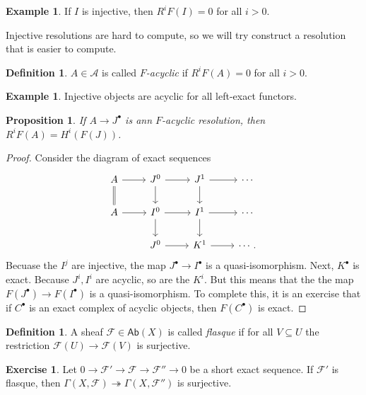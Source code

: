 \documentclass[leqno, openany]{memoir}
\newtheorem{prop}[thm]{Proposition}
\theoremstyle{definition}
\newtheorem{defn}[thm]{Definition}
\newtheorem{exm}[thm]{Example}
\newtheorem{exer}[thm]{Exercise}
\theoremstyle{remark}
\theoremstyle{plain}
\theoremstyle{definition}
\theoremstyle{remark}
\newcommand{\mc}[1]{\mathcal{#1}}
\newcommand{\ms}[1]{\mathsf{#1}}
\begin{document}
\begin{exm}
    If $I$ is injective, then $R^i F(I) = 0$ for all $i > 0$.
\end{exm}

Injective resolutions are hard to compute, so we will try construct a resolution that is easier to compute. 

\begin{defn}
    $A \in \mc{A}$ is called \textit{$F$-acyclic} if $R^i F(A) = 0$ for all $i > 0$.
\end{defn}

\begin{exm}
    Injective objects are acyclic for all left-exact functors.
\end{exm}

\begin{prop}
    If $A \to J^{\bullet}$ is ann $F$-acyclic resolution, then $R^i F(A) = H^i(F(J))$.
\end{prop}

\begin{proof}
    Consider the diagram of exact sequences
    \begin{equation*}
    \begin{tikzcd}
        A \ar{r} \ar[equal]{d} & J^0 \ar{r} \ar{d} & J^1 \ar{r} \ar{d} & \cdots \\
        A \ar{r} & I^0 \ar{r} \ar{d} & I^1 \ar{r} \ar{d} & \cdots \\
                 & J^0 \ar{r} & K^1 \ar{r} & \cdots.
    \end{tikzcd}
    \end{equation*}
    Becuase the $I^j$ are injective, the map $J^{\bullet} \to I^{\bullet}$ is a quasi-isomorphism. Next, $K^{\bullet}$ is exact. Because $J^i, I^i$ are acyclic, so are the $K^i$. But this means that the the map $F(J^{\bullet}) \to F(I^{\bullet})$ is a quasi-isomorphism. To complete this, it is an exercise that if $C^{\bullet}$ is an exact complex of acyclic objects, then $F(C^{\bullet})$ is exact.
\end{proof}

\begin{defn}
    A sheaf $\mc{F} \in \ms{Ab}(X)$ is called \textit{flasque} if for all $V \subseteq U$ the restriction $\mc{F}(U) \to \mc{F}(V)$ is surjective.
\end{defn}

\begin{exer}
    Let $0 \to \mc{F}' \to \mc{F} \to \mc{F}'' \to 0$ be a short exact sequence. If $\mc{F}'$ is flasque, then $\Gamma(X, \mc{F}) \twoheadrightarrow \Gamma(X, \mc{F}'')$ is surjective.
\end{exer}
\end{document}
